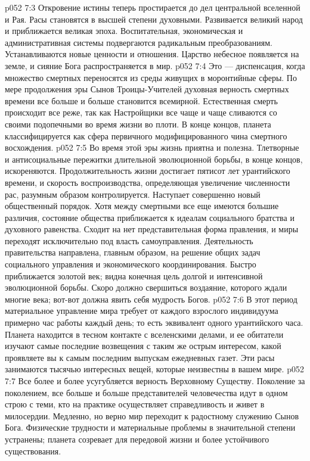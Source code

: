 \vs p052 7:3 \pc Откровение истины теперь простирается до дел центральной вселенной и Рая. Расы становятся в высшей степени духовными. Развивается великий народ и приближается великая эпоха. Воспитательная, экономическая и административная системы подвергаются радикальным преобразованиям. Устанавливаются новые ценности и отношения. Царство небесное появляется на земле, и сияние Бога распространяется в мир.
\vs p052 7:4 Это --- диспенсация, когда множество смертных переносятся из среды живущих в моронтийные сферы. По мере продолжения эры Сынов Троицы\hyp{}Учителей духовная верность смертных времени все больше и больше становится всемирной. Естественная смерть происходит все реже, так как Настройщики все чаще и чаще сливаются со своими подопечными во время жизни во плоти. В конце концов, планета классифицируется как сфера первичного модифицированного чина смертного восхождения.
\vs p052 7:5 \pc Во время этой эры жизнь приятна и полезна. Тлетворные и антисоциальные пережитки длительной эволюционной борьбы, в конце концов, искореняются. Продолжительность жизни достигает пятисот лет урантийского времени, и скорость воспроизводства, определяющая увеличение численности рас, разумным образом контролируется. Наступает совершенно новый общественный порядок. Хотя между смертными все еще имеются большие различия, состояние общества приближается к идеалам социального братства и духовного равенства. Сходит на нет представительная форма правления, и миры переходят исключительно под власть самоуправления. Деятельность правительства направлена, главным образом, на решение общих задач социального управления и экономического координирования. Быстро приближается золотой век; видна конечная цель долгой и интенсивной эволюционной борьбы. Скоро должно свершиться воздаяние, которого ждали многие века; вот\hyp{}вот должна явить себя мудрость Богов.
\vs p052 7:6 В этот период материальное управление мира требует от каждого взрослого индивидуума примерно час работы каждый день; то есть эквивалент одного урантийского часа. Планета находится в тесном контакте с вселенскими делами, и ее обитатели изучают самые последние возвещения с таким же острым интересом, какой проявляете вы к самым последним выпускам ежедневных газет. Эти расы занимаются тысячью интересных вещей, которые неизвестны в вашем мире.
\vs p052 7:7 \pc Все более и более усугубляется верность Верховному Существу. Поколение за поколением, все больше и больше представителей человечества идут в одном строю с теми, кто на практике осуществляет справедливость и живет в милосердии. Медленно, но верно мир переходит к радостному служению Сынов Бога. Физические трудности и материальные проблемы в значительной степени устранены; планета созревает для передовой жизни и более устойчивого существования.
